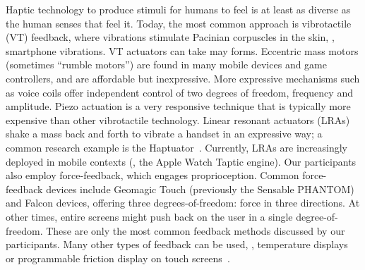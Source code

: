 Haptic technology to produce stimuli for humans to feel is at least as diverse as the human senses that feel it.
Today, the most common approach is vibrotactile (VT) feedback, where vibrations stimulate Pacinian corpuscles in the skin, \eg, smartphone vibrations.
VT actuators can take may forms.
Eccentric mass motors (sometimes ``rumble motors'') are found in many mobile devices and game controllers, and are affordable but inexpressive.
More expressive mechanisms such as voice coils %
offer independent control of two degrees of freedom, frequency and amplitude.
Piezo actuation is a very responsive technique that is typically more expensive than other vibrotactile technology.
Linear resonant actuators (LRAs) shake a mass back and forth to vibrate a handset in an expressive way; a common research example is the Haptuator~\citep{Yao2010}.
Currently, LRAs are increasingly deployed in mobile contexts (\eg, the Apple Watch Taptic engine).
Our participants also employ force-feedback, which engages proprioception.
Common force-feedback devices include Geomagic Touch (previously the Sensable PHANTOM) and Falcon devices, offering three degrees-of-freedom: force in three directions.
At other times, entire screens might push back on the user in a single degree-of-freedom.
These are only the most common feedback methods discussed by our participants.
Many other types of feedback can be used, \eg, temperature displays~\citep{Jones2002} or programmable friction display on touch screens~\citep{Levesque2011,Winfield2007}.



